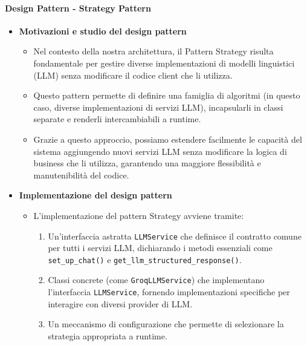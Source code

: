 \documentclass[10pt]{article}
\begin{document}
    \paragraph{Design Pattern - Strategy Pattern}
    \begin{itemize} 
    \item \textbf{Motivazioni e studio del design pattern}
    \begin{itemize}
        \item Nel contesto della nostra architettura, il Pattern Strategy risulta fondamentale per gestire diverse implementazioni di modelli linguistici (LLM) senza modificare il codice client che li utilizza.
        \item Questo pattern permette di definire una famiglia di algoritmi (in questo caso, diverse implementazioni di servizi LLM), incapsularli in classi separate e renderli intercambiabili a runtime.
        \item Grazie a questo approccio, possiamo estendere facilmente le capacità del sistema aggiungendo nuovi servizi LLM senza modificare la logica di business che li utilizza, garantendo una maggiore flessibilità e manutenibilità del codice.
    \end{itemize}
    
    \item \textbf{Implementazione del design pattern}
    \begin{itemize}
        \item L'implementazione del pattern Strategy avviene tramite:
        \begin{enumerate}
            \item Un'interfaccia astratta \texttt{LLMService} che definisce il contratto comune per tutti i servizi LLM, dichiarando i metodi essenziali come \texttt{set\_up\_chat()} e \texttt{get\_llm\_structured\_response()}.
            \item Classi concrete (come \texttt{GroqLLMService}) che implementano l'interfaccia \texttt{LLMService}, fornendo implementazioni specifiche per interagire con diversi provider di LLM.
            \item Un meccanismo di configurazione che permette di selezionare la strategia appropriata a runtime.
        \end{enumerate}
    \end{itemize}
    

\end{itemize}
\end{document}
